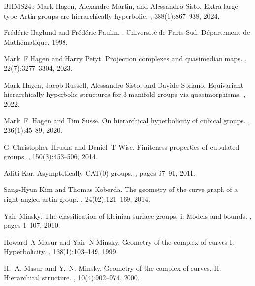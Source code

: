\documentclass{amsart}
\theoremstyle{definition}
\theoremstyle{remark}
\theoremstyle{definition}
\begin{document}
\begin{thebibliography}{BHMS24b}
Mark Hagen, Alexandre Martin, and Alessandro Sisto.
\newblock Extra-large type {A}rtin groups are hierarchically hyperbolic.
, 388(1):867--938, 2024.

Fr{\'e}d{\'e}ric Haglund and Fr{\'e}d{\'e}ric Paulin.
.
\newblock Universit{\'e} de Paris-Sud. D{\'e}partement de Math{\'e}matique,
  1998.

Mark~F Hagen and Harry Petyt.
\newblock Projection complexes and quasimedian maps.
, 22(7):3277--3304, 2023.

Mark Hagen, Jacob Russell, Alessandro Sisto, and Davide Spriano.
\newblock Equivariant hierarchically hyperbolic structures for 3-manifold
  groups via quasimorphisms.
, 2022.

Mark~F. Hagen and Tim Susse.
\newblock On hierarchical hyperbolicity of cubical groups.
, 236(1):45--89, 2020.

G~Christopher Hruska and Daniel~T Wise.
\newblock Finiteness properties of cubulated groups.
, 150(3):453--506, 2014.

Aditi Kar.
\newblock Asymptotically {CAT}(0) groups.
, pages 67--91, 2011.

Sang-Hyun Kim and Thomas Koberda.
\newblock The geometry of the curve graph of a right-angled artin group.
,
  24(02):121--169, 2014.

Yair Minsky.
\newblock The classification of kleinian surface groups, i: Models and bounds.
, pages 1--107, 2010.

Howard~A Masur and Yair~N Minsky.
\newblock Geometry of the complex of curves {I}: Hyperbolicity.
, 138(1):103--149, 1999.

H.~A. Masur and Y.~N. Minsky.
\newblock Geometry of the complex of curves. {II}. {H}ierarchical structure.
, 10(4):902--974, 2000.


\end{thebibliography}
\end{document}
